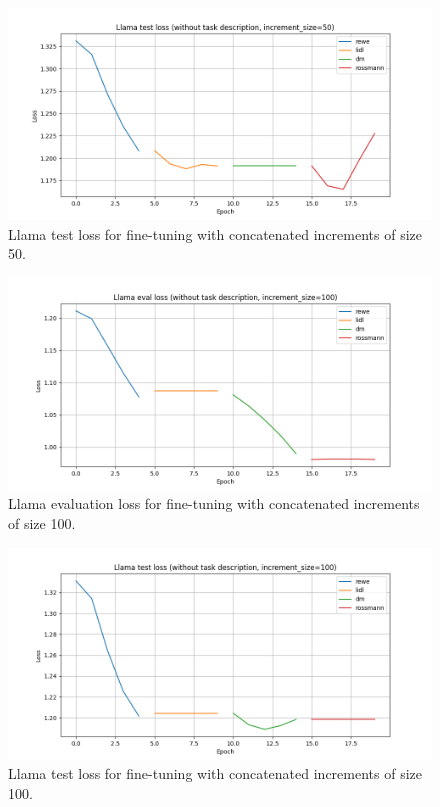 \documentclass[licencjacka,en]{pracamgr}
\begin{document}
\begin{figure}[htbp]
    \centering
    \includegraphics[width=0.8\linewidth]{bachelor_images/llama_ft/llama-inc-50-tot-test.png}
    \caption{Llama test loss for fine-tuning with concatenated increments of size 50.}
    \label{fig:llama-inc-tot-50-test}
\end{figure}

\begin{figure}[htbp]
    \centering
    \includegraphics[width=0.8\linewidth]{bachelor_images/llama_ft/llama-inc-100-tot-eval.png}
    \caption{Llama evaluation loss for fine-tuning with concatenated increments of size 100.}
    \label{fig:llama-inc-tot-100-eval}
\end{figure}

\begin{figure}[htbp]
    \centering
    \includegraphics[width=0.8\linewidth]{bachelor_images/llama_ft/llama-inc-100-tot-test.png}
    \caption{Llama test loss for fine-tuning with concatenated increments of size 100.}
    \label{fig:llama-inc-tot-100-test}
\end{figure}
\end{document}
